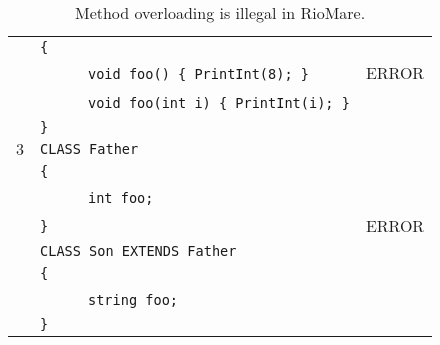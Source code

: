 \documentclass{article}
\begin{document}
\begin{table}[h]
\begin{tabular}{|l|l|l|}
     & \verb"{"                                       &       \\
     & ~ ~ ~ ~\verb"void foo() { PrintInt(8); }"      & ERROR \\
     & ~ ~ ~ ~\verb"void foo(int i) { PrintInt(i); }" &       \\
     & \verb"}"                                       &       \\
\hline
 $3$ & \verb"CLASS Father"             &       \\
     & \verb"{"                        &       \\
     & ~ ~ ~ ~\verb"int foo;"          &       \\
     & \verb"}"                        & ERROR \\
     & \verb"CLASS Son EXTENDS Father" &       \\
     & \verb"{"                        &       \\
     & ~ ~ ~ ~\verb"string foo;"       &       \\
     & \verb"}"                        &       \\
\hline
\end{tabular}
\caption{Method overloading is illegal in RioMare.
\label{Table_Code_Examples_Overload_Override}}
\end{table}
\end{document}
